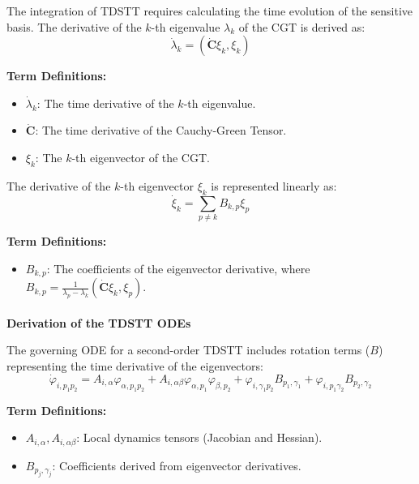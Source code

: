 \documentclass[
  letterpaper,
  DIV=11,
  numbers=noendperiod,
  oneside]{scrartcl}
\makeatletter
\let\oldparagraph\paragraph
\renewcommand{\paragraph}{
    \@ifstar
      \xxxParagraphStar
      \xxxParagraphNoStar
  }
\newcommand{\xxxParagraphStar}[1]{\oldparagraph*{#1}\mbox{}}
\newcommand{\xxxParagraphNoStar}[1]{\oldparagraph{#1}\mbox{}}
\providecommand{\tightlist}{%
  \setlength{\itemsep}{0pt}\setlength{\parskip}{0pt}}
\makeatother
\begin{document}
The integration of TDSTT requires calculating the time evolution of the
sensitive basis. The derivative of the \(k\)-th eigenvalue \(\lambda_k\)
of the CGT is derived as: \[
\dot{\lambda}_k = (\dot{\mathbf{C}} \xi_k, \xi_k)
\]

\textbf{Term Definitions:}

\begin{itemize}
\item
  \(\dot{\lambda}_k\): The time derivative of the \(k\)-th eigenvalue.
\item
  \(\dot{\mathbf{C}}\): The time derivative of the Cauchy-Green Tensor.
\item
  \(\xi_k\): The \(k\)-th eigenvector of the CGT.
\end{itemize}

The derivative of the \(k\)-th eigenvector \(\xi_k\) is represented
linearly as: \[
\dot{\xi}_k = \sum_{p \neq k} B_{k,p} \xi_p
\]

\textbf{Term Definitions:}

\begin{itemize}
\tightlist
\item
  \(B_{k,p}\): The coefficients of the eigenvector derivative, where
  \(B_{k,p} = \frac{1}{\lambda_p - \lambda_k} (\dot{\mathbf{C}} \xi_k, \xi_p)\).
\end{itemize}

\paragraph{\texorpdfstring{\textbf{Derivation of the TDSTT
ODEs}}{Derivation of the TDSTT ODEs}}\label{derivation-of-the-tdstt-odes}

The governing ODE for a second-order TDSTT includes rotation terms
(\(B\)) representing the time derivative of the eigenvectors: \[
\dot{\varphi}_{i, p_1 p_2} = A_{i, \alpha} \varphi_{\alpha, p_1 p_2} + A_{i, \alpha \beta} \varphi_{\alpha, p_1} \varphi_{\beta, p_2} + \varphi_{i, \gamma_1 p_2} B_{p_1, \gamma_1} + \varphi_{i, p_1 \gamma_2} B_{p_2, \gamma_2}
\]

\textbf{Term Definitions:}

\begin{itemize}
\item
  \(A_{i, \alpha}, A_{i, \alpha \beta}\): Local dynamics tensors
  (Jacobian and Hessian).
\item
  \(B_{p_j, \gamma_j}\): Coefficients derived from eigenvector
  derivatives.
\end{itemize}
\end{document}
